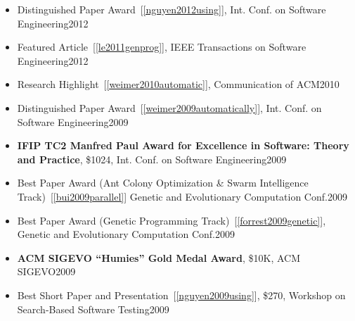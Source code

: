 \documentclass[11pt]{article}
\begin{document}
\begin{itemize}
\item Distinguished Paper Award~[\ref{nguyen2012using}], Int. Conf. on Software Engineering\hfill 2012

\item Featured Article~[\ref{le2011genprog}], IEEE Transactions on Software Engineering\hfill 2012

\item Research Highlight~[\ref{weimer2010automatic}], Communication of ACM\hfill 2010

\item Distinguished Paper Award~[\ref{weimer2009automatically}], Int. Conf. on Software Engineering\hfill 2009 

\item \textbf{IFIP TC2 Manfred Paul Award for Excellence in Software: Theory and Practice}, \$1024, Int. Conf. on Software Engineering\hfill 2009

  
\item Best Paper Award (Ant Colony Optimization \& Swarm Intelligence Track)~[\ref{bui2009parallel}] Genetic and Evolutionary Computation Conf.\hfill 2009
\item Best Paper Award (Genetic Programming Track)~[\ref{forrest2009genetic}], Genetic and Evolutionary Computation Conf.\hfill 2009
\item \textbf{ACM SIGEVO “Humies” Gold Medal Award}, \$10K, ACM SIGEVO\hfill 2009
\item Best Short Paper and Presentation~[\ref{nguyen2009using}], \$270, Workshop on Search-Based Software Testing\hfill 2009



\end{itemize}
\end{document}
